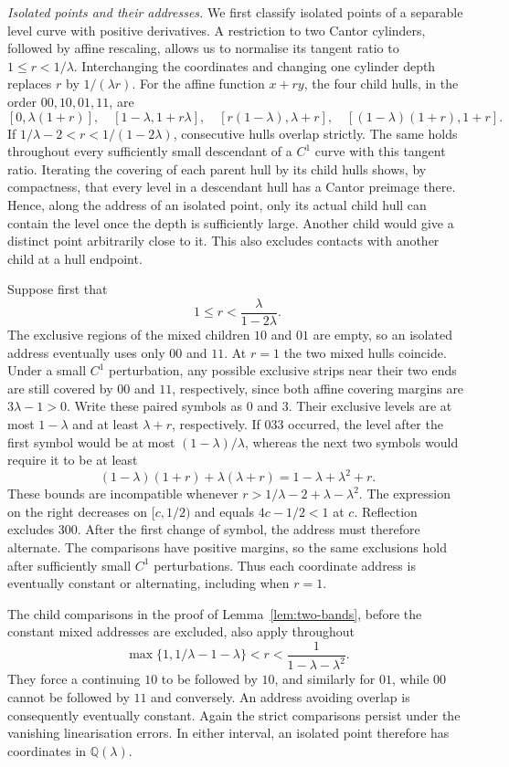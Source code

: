 \par\medskip\noindent\emph{Isolated points and their addresses.}
We first classify isolated points of a separable level curve with positive derivatives. A restriction to two Cantor cylinders, followed by affine rescaling, allows us to normalise its tangent ratio to $1\le r<1/\lambda$. Interchanging the coordinates and changing one cylinder depth replaces $r$ by $1/(\lambda r)$.
For the affine function $x+ry$, the four child hulls, in the order $00,10,01,11$, are
\[
[0,\lambda(1+r)],\quad
[1-\lambda,1+r\lambda],\quad
[r(1-\lambda),\lambda+r],\quad
[(1-\lambda)(1+r),1+r].
\]
If $1/\lambda-2<r<1/(1-2\lambda)$, consecutive hulls overlap strictly. The same holds throughout every sufficiently small descendant of a $C^1$ curve with this tangent ratio. Iterating the covering of each parent hull by its child hulls shows, by compactness, that every level in a descendant hull has a Cantor preimage there. Hence, along the address of an isolated point, only its actual child hull can contain the level once the depth is sufficiently large. Another child would give a distinct point arbitrarily close to it. This also excludes contacts with another child at a hull endpoint.

Suppose first that
\[
1\le r<\frac{\lambda}{1-2\lambda}.
\]
The exclusive regions of the mixed children $10$ and $01$ are empty, so an isolated address eventually uses only $00$ and $11$. At $r=1$ the two mixed hulls coincide. Under a small $C^1$ perturbation, any possible exclusive strips near their two ends are still covered by $00$ and $11$, respectively, since both affine covering margins are $3\lambda-1>0$. Write these paired symbols as $0$ and $3$. Their exclusive levels are at most $1-\lambda$ and at least $\lambda+r$, respectively. If $033$ occurred, the level after the first symbol would be at most $(1-\lambda)/\lambda$, whereas the next two symbols would require it to be at least
\[
(1-\lambda)(1+r)+\lambda(\lambda+r)
=1-\lambda+\lambda^2+r.
\]
These bounds are incompatible whenever
$r>1/\lambda-2+\lambda-\lambda^2$.
The expression on the right decreases on $[c,1/2)$ and equals $4c-1/2<1$ at $c$. Reflection excludes $300$. After the first change of symbol, the address must therefore alternate. The comparisons have positive margins, so the same exclusions hold after sufficiently small $C^1$ perturbations. Thus each coordinate address is eventually constant or alternating, including when $r=1$.

The child comparisons in the proof of Lemma~\ref{lem:two-bands}, before the constant mixed addresses are excluded, also apply throughout
\[
\max\{1,1/\lambda-1-\lambda\}<r<\frac1{1-\lambda-\lambda^2}.
\]
They force a continuing $10$ to be followed by $10$, and similarly for $01$, while $00$ cannot be followed by $11$ and conversely. An address avoiding overlap is consequently eventually constant. Again the strict comparisons persist under the vanishing linearisation errors. In either interval, an isolated point therefore has coordinates in $\mathbb Q(\lambda)$.


